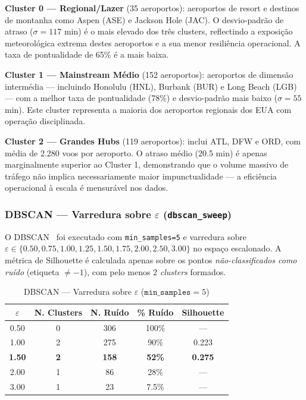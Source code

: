 \documentclass[conference]{IEEEtran}
\begin{document}
\textbf{Cluster 0 — Regional/Lazer} (35 aeroportos): aeroportos de resort e
destinos de montanha como Aspen (ASE) e Jackson Hole (JAC). O desvio-padrão de
atraso ($\sigma = 117$ min) é o mais elevado dos três clusters, reflectindo a
exposição meteorológica extrema destes aeroportos e a sua menor resiliência
operacional. A taxa de pontualidade de 65\% é a mais baixa.

\textbf{Cluster 1 — Mainstream Médio} (152 aeroportos): aeroportos de dimensão
intermédia — incluindo Honolulu (HNL), Burbank (BUR) e Long Beach (LGB) — com a
melhor taxa de pontualidade (78\%) e desvio-padrão mais baixo ($\sigma = 55$ min).
Este cluster representa a maioria dos aeroportos regionais dos EUA com operação
disciplinada.

\textbf{Cluster 2 — Grandes Hubs} (119 aeroportos): inclui ATL, DFW e ORD, com
média de 2.280 voos por aeroporto. O atraso médio (20.5 min) é apenas
marginalmente superior ao Cluster 1, demonstrando que o volume massivo de tráfego
não implica necessariamente maior impunctualidade — a eficiência operacional à
escala é mensurável nos dados.

\subsubsection{DBSCAN — Varredura sobre $\varepsilon$ (\texttt{dbscan\_sweep})}
O DBSCAN~\cite{dbscan} foi executado com \texttt{min\_samples=5} e varredura
sobre $\varepsilon \in \{0.50, 0.75, 1.00, 1.25, 1.50, 1.75, 2.00, 2.50, 3.00\}$
no espaço escalonado. A métrica de Silhouette é calculada apenas sobre os pontos
\emph{não-classificados como ruído} (etiqueta $\neq -1$), com pelo menos 2
\textit{clusters} formados.

\begin{table}[h]
\centering
\caption{DBSCAN — Varredura sobre $\varepsilon$ ($\texttt{min\_samples}=5$)}
\label{tab:dbscan}
\begin{tabular}{ccccc}
\toprule
$\varepsilon$ & N. Clusters & N. Ruído & \% Ruído & Silhouette \\
\midrule
0.50 & 0  & 306 & 100\% & — \\
1.00 & 2  & 275 & 90\%  & 0.223 \\
\textbf{1.50} & \textbf{2} & \textbf{158} & \textbf{52\%} & \textbf{0.275} \\
2.00 & 1  & 86  & 28\%  & — \\
3.00 & 1  & 23  & 7.5\% & — \\
\bottomrule
\end{tabular}
\end{table}
\end{document}
